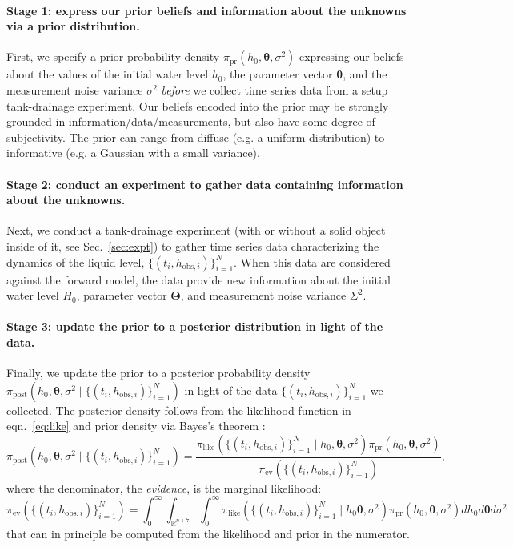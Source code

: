 \documentclass[openacc]{rsproca_new}%
\newcommand\thedata {$\{(t_i,h_{\text{obs}, i})\}_{i=1}^{N}$\xspace}
\newcommand\thedatanomath {\{(t_i,h_{\text{obs}, i})\}_{i=1}^{N}}
\begin{document}
\vspace{-\baselineskip}
\paragraph{Stage 1: express our prior beliefs and information about the unknowns via a prior distribution.}
First, we specify a prior probability density $\pi_{\text{pr}}(h_0, \boldsymbol \theta, \sigma^2)$ expressing our beliefs about the values of the initial water level $h_0$, the parameter vector $\boldsymbol \theta$, and the measurement noise variance $\sigma^2$ \emph{before} we collect time series data from a setup tank-drainage experiment.
Our beliefs encoded into the prior may be strongly grounded in information/data/measurements, but also have some degree of subjectivity.
The prior can range from diffuse (e.g. a uniform distribution) to informative (e.g. a Gaussian with a small variance). \cite{van2021bayesian}

\vspace{-\baselineskip}
\paragraph{Stage 2: conduct an experiment to gather data containing information about the unknowns.}
Next, we conduct a tank-drainage experiment (with or without a solid object inside of it, see Sec.~\ref{sec:expt}) to gather time series data characterizing the dynamics of the liquid level, \thedata. When this data are considered against the forward model, the data provide new information about the initial water level $H_0$, parameter vector $\boldsymbol \Theta$, and measurement noise variance $\Sigma^2$.

\vspace{-\baselineskip}
\paragraph{Stage 3: update the prior to a posterior distribution in light of the data.}
Finally, we update the prior to a posterior probability density $\pi_{\text{post}}(h_0, \boldsymbol \theta, \sigma^2 \mid \thedatanomath)$ in light of the data \thedata we collected. 
The posterior density follows from the likelihood function in eqn.~\ref{eq:like} and prior density via Bayes's theorem \cite{van2021bayesian,calvetti2018inverse}:
\begin{equation}
	\pi_{\text{post}}(h_0, \boldsymbol \theta, \sigma^2 \mid \thedatanomath) = \frac{
	\pi_{\text{like}}(\thedatanomath \mid h_0, \boldsymbol \theta, \sigma^2 ) 
	\pi_{\text{pr}}(h_0, \boldsymbol \theta, \sigma^2)
	}{
	\pi_{\text{ev}}(\thedatanomath) 
	}, \label{eq:post}
\end{equation} where the denominator, the \emph{evidence}, is the marginal likelihood:
\begin{equation}
    \pi_{\text{ev}}(\thedatanomath) = \int_0^\infty \int_{\mathbb{R}^{n+7}} \int_0^\infty \pi_{\text{like}}(\thedatanomath \mid h_0 \boldsymbol \theta, \sigma^2)  
	\pi_{\text{pr}}(h_0, \boldsymbol \theta, \sigma^2) dh_0 d \boldsymbol\theta d\sigma^2 \label{eq:ev}
\end{equation}
that can in principle be computed from the likelihood and prior in the numerator. 
\end{document}
